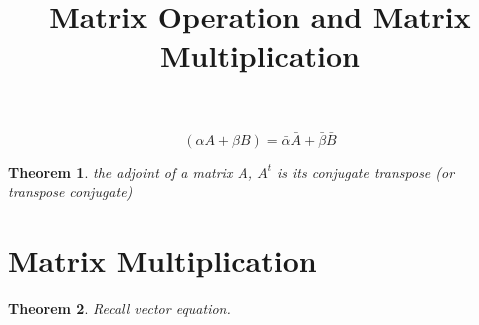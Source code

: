 \documentclass{exam}
\title{Matrix Operation and Matrix Multiplication}
\date{\vspace{-5ex}}
\newtheorem{thm}{Theorem}[section]
\begin{document}
\maketitle

\newcommand{\sol} {\textbf{Solution:}}
\newcommand{\LIVHS} {\textbf{Linearly Independent Vectors and Homogeneous Systems}}
\newcommand{\FVCS} {\textbf{Free Variables for Consistent Systems}}
\newcommand{\HSC} {\textbf{Homogeneous Systems are Consistent}}
\newcommand{\ls}[1]{$\mathcal{LS}(A,\textbf{#1})$~}
\newcommand{\p} {$\boxed{1}$~}
\newcommand*\conj[1]{\bar{#1}}
\newcommand*\Subtitle[1]{\noindent\textbf{#1}}
\newcommand*\Domain[1]{\in\mathbb{C}^{#1}}
\newcommand{\Matrix}[3]{$\begin{vmatrix} #1 \\ #2 \\ #3 \end{vmatrix}$~}
\newcommand{\Forall}{$\forall$~}

\newcommand{\QAA} {
\begin{vmatrix}
  2 & 3 & -1 & 0 \\
  1 & -2 & 7 & 3 \\
  1 & 5 & 3 & 2 \\
\end{vmatrix}
}

\newcommand{\QAB} {
\begin{bmatrix}
  2 \\
  -3 \\
  0 \\
  5 \\
\end{bmatrix}
}

\newcommand{\QAC} {
\begin{bmatrix}
  6 & 8 & 4 \\
  -2 & 1 & 0 \\
  9 & -5 & 6 \\
\end{bmatrix}
}

\[
(\alpha A + \beta B) = \conj{\alpha} \conj{A} + \conj{\beta} \conj{B}
\]

\begin{thm}
  the adjoint of a matrix A, \(A^{t}\) is its conjugate transpose (or transpose conjugate)
\end{thm}

\section{Matrix Multiplication}
\begin{thm}
  Recall vector equation.
\end{thm}
\end{document}

